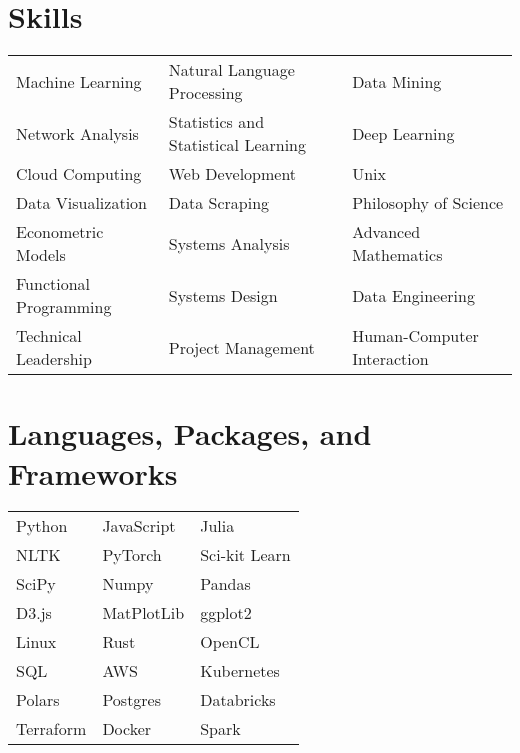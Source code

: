 \documentclass[10pt,a4paper,sans]{moderncv}
\begin{document}
\section{Skills}

\def\arraystretch{0}
\raggedleft
\begin{tabularx}{.9\textwidth}{>{\center\arraybackslash}X >{\center\arraybackslash}X >{\center\arraybackslash}X}
	Machine Learning & Natural Language Processing & Data Mining \\
	Network Analysis & Statistics and Statistical Learning & Deep Learning \\
	Cloud Computing & Web Development & Unix \\
	Data Visualization & Data Scraping & Philosophy of Science \\
	Econometric Models & Systems Analysis & Advanced Mathematics \\
  Functional Programming & Systems Design & Data Engineering \\
  Technical Leadership & Project Management & Human-Computer Interaction
\end{tabularx}

\section{Languages, Packages, and Frameworks}
\def\arraystretch{0}
\raggedleft
\begin{tabularx}{.9\textwidth}{>{\center\arraybackslash}X >{\center\arraybackslash}X >{\center\arraybackslash}X}
Python & JavaScript & Julia \\
NLTK & PyTorch & Sci-kit Learn \\
SciPy & Numpy & Pandas \\
D3.js & MatPlotLib & ggplot2 \\
Linux & Rust & OpenCL \\
  SQL & AWS & Kubernetes \\
  Polars & Postgres & Databricks \\
  Terraform & Docker & Spark

\end{tabularx}
\end{document}
